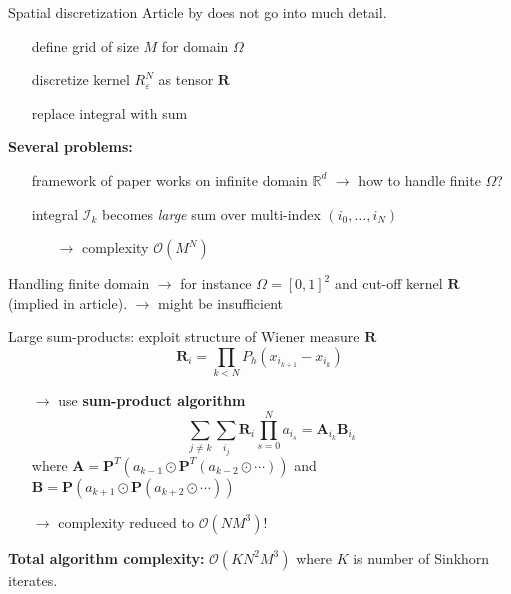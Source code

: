 \documentclass[xcolor={dvipsnames}]{beamer}
\newcommand{\RR}{\mathbb{R}}
\newcommand{\bfR}{\mathbf{R}}
\newcommand{\bfP}{\mathbf{P}}
\newcommand{\calI}{\mathcal{I}}
\newcommand{\calO}{\mathcal{O}}
\renewcommand{\epsilon}{\varepsilon}
\newcommand{\redfont}{\color{darkred}}
\newcommand{\greenfont}{\color{Green!90!black}}
\begin{document}
\begin{frame}{Spatial discretization}
	Article by \textcite{benamou2018entropy} does not go into much detail.
	\begin{itemize}
		\item[\textbullet] define grid of size $M$ for domain $\Omega$
		\item[\textbullet] discretize kernel $R^N_\epsilon$ as tensor $\bfR$
		\item[\textbullet] replace integral with sum
	\end{itemize}
	
	\pause\textbf{\redfont Several problems:}
	\begin{itemize}
		\item[\textbullet] framework of paper works on infinite domain $\RR^d$ $\rightarrow$ how to handle finite $\Omega$?
		\item[\textbullet] integral $\calI_k$ becomes \textit{large} sum over multi-index $(i_0,\ldots,i_N)$
		\begin{itemize}
			\item[$\rightarrow$] \redfont complexity $\calO(M^N)$
		\end{itemize}
	\end{itemize}
	
\end{frame}

\begin{frame}
	Handling finite domain $\rightarrow$ for instance $\Omega = [0,1]^2$ and cut-off kernel $\bfR$ (implied in article).
	{\redfont $\rightarrow$ might be insufficient}
	
	Large sum-products: exploit structure of Wiener measure $\bfR$
	\[
		\bfR_i = \prod_{k<N} P_h(x_{i_{k+1}} - x_{i_k})
	\]\pause
	\begin{itemize}
		\item[$\rightarrow$] use \textbf{sum-product algorithm}
		\[
		\sum_{j\neq k}\sum_{i_j} \bfR_i \prod_{s=0}^N a_{i_s} =
		\mathbf{A}_{i_k} \mathbf{B}_{i_k}
		\]
		where $\mathbf{A} = \bfP^T(a_{k-1} \odot \bfP^T(a_{k-2}\odot\cdots))$ and $\mathbf{B} = \bfP(a_{k+1} \odot \bfP (a_{k+2}\odot\cdots))$
		\item[$\rightarrow$] {\greenfont complexity reduced to $\calO(NM^3)$!}
	\end{itemize}
	\pause
	
	\textbf{Total algorithm complexity:} $\calO(K N^2 M^3)$ where $K$ is number of Sinkhorn iterates.
	
\end{frame}
\end{document}
